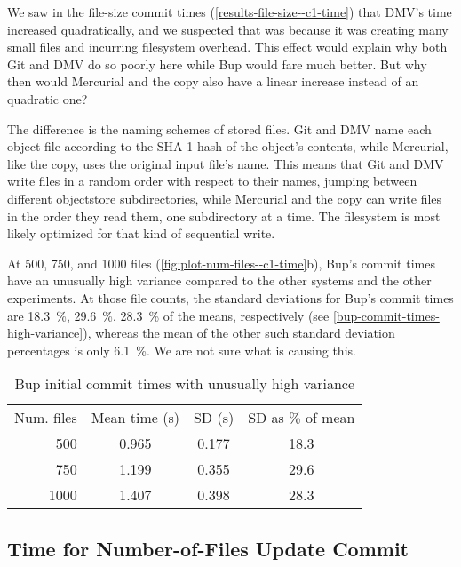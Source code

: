 We saw in the file-size commit times (\autoref{results-file-size--c1-time}) that
DMV's time increased quadratically, and we suspected that was because it was
creating many small files and incurring filesystem overhead. This effect would
explain why both Git and DMV do so poorly here while Bup would fare much better.
But why then would Mercurial and the copy also have a linear increase instead of
an quadratic one?

The difference is the naming schemes of stored files. Git and DMV name each
object file according to the SHA-1 hash of the object's contents, while
Mercurial, like the copy, uses the original input file's name. This means that
Git and DMV write files in a random order with respect to their names, jumping
between different \gls{objectstore} subdirectories, while Mercurial and the copy
can write files in the order they read them, one subdirectory at a time. The
filesystem is most likely optimized for that kind of sequential write.

At \num{500}, \num{750}, and \num{1000} files
(\autoref{fig:plot-num-files--c1-time}b), Bup's commit times have an unusually
high variance compared to the other systems and the other experiments. At those
file counts, the standard deviations for Bup's commit times are
\SI{18.3}{\percent}, \SI{29.6}{\percent}, \SI{28.3}{\percent} of the means,
respectively (see \autoref{bup-commit-times-high-variance}), whereas the mean of
the other such standard deviation percentages is only \SI{6.1}{\percent}. We are
not sure what is causing this.

\begin{table}[h]
    \caption{Bup initial commit times with unusually high variance}
    \label{bup-commit-times-high-variance}
    \centering
    \begin{tabular}{rccc}
        Num. files & Mean time (s) & SD (s) & SD as \% of mean \\
           500  &   0.965  &   0.177  &  18.3 \\
           750  &   1.199  &   0.355  &  29.6 \\
          1000  &   1.407  &   0.398  &  28.3 \\
    \end{tabular}
\end{table}

%


\cleardoublepage

\subsection{Time for Number-of-Files Update Commit}

